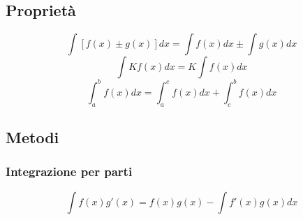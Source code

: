 \subsection{Proprietà}
\begin{equation}
    \int[f(x)\pm g(x)]dx = \int f(x)dx \pm \int g(x)dx
\end{equation}
\begin{equation}
    \int Kf(x)dx = K\int f(x)dx
\end{equation}
\begin{equation}
    \int_a^bf(x)dx = \int_a^cf(x)dx  + \int_c^bf(x)dx
\end{equation}


\subsection{Metodi}
\subsubsection{Integrazione per parti}
\begin{equation}
    \int f(x)g'(x) = f(x)g(x) - \int f'(x)g(x)dx
\end{equation}